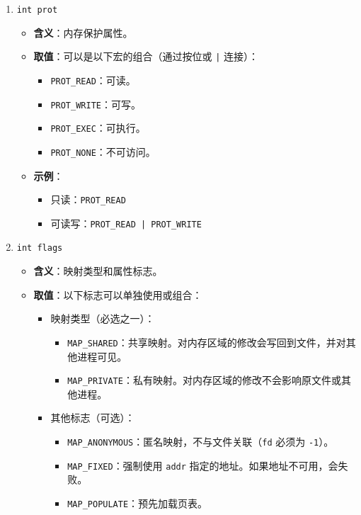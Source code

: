 \begin{enumerate}
    \item \texttt{int prot}
    \begin{itemize}
        \item \textbf{含义}：内存保护属性。
        \item \textbf{取值}：可以是以下宏的组合（通过按位或 \texttt{|} 连接）：
        \begin{itemize}
            \item \texttt{PROT\_READ}：可读。
            \item \texttt{PROT\_WRITE}：可写。
            \item \texttt{PROT\_EXEC}：可执行。
            \item \texttt{PROT\_NONE}：不可访问。
        \end{itemize}
        \item \textbf{示例}：
        \begin{itemize}
            \item 只读：\texttt{PROT\_READ}
            \item 可读写：\texttt{PROT\_READ | PROT\_WRITE}
        \end{itemize}
    \end{itemize}

    \item \texttt{int flags}
    \begin{itemize}
        \item \textbf{含义}：映射类型和属性标志。
        \item \textbf{取值}：以下标志可以单独使用或组合：
        \begin{itemize}
            \item 映射类型（必选之一）：
            \begin{itemize}
                \item \texttt{MAP\_SHARED}：共享映射。对内存区域的修改会写回到文件，并对其他进程可见。
                \item \texttt{MAP\_PRIVATE}：私有映射。对内存区域的修改不会影响原文件或其他进程。
            \end{itemize}
            \item 其他标志（可选）：
            \begin{itemize}
                \item \texttt{MAP\_ANONYMOUS}：匿名映射，不与文件关联（\texttt{fd} 必须为 \texttt{-1}）。
                \item \texttt{MAP\_FIXED}：强制使用 \texttt{addr} 指定的地址。如果地址不可用，会失败。
                \item \texttt{MAP\_POPULATE}：预先加载页表。
            \end{itemize}
        \end{itemize}
    \end{itemize}


\end{enumerate}
